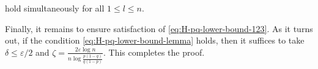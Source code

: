 %
%
hold simultaneously for all $1\leq l\leq n$. 



Finally, it remains to ensure satisfaction of \eqref{eq:H-pq-lower-bound-123}. As it turns out, if the condition \eqref{eq:H-pq-lower-bound-lemma}
holds, then it suffices to take $\delta\leq \varepsilon / 2$ and 
$\zeta=\frac{2\varepsilon\log n}{n\log\frac{p(1-q)}{q(1-p)}}$. This completes the proof.  


